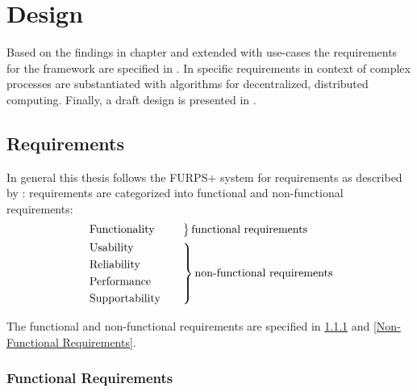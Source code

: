 \chapter{Design} \label{Design}


Based on the findings in chapter  and extended with use-cases the requirements for the framework are specified in . In  specific requirements in context of complex processes are substantiated with algorithms for decentralized, distributed computing. Finally, a draft design is presented in .

	\section{Requirements} \label{Requirements}
	
	In general this thesis follows the FURPS+ system for requirements as described by \textcite{Online:FURPS}: 
	requirements are categorized into functional and non-functional requirements:
	\begin{alignat*}{1}
		& \begin{rcases*}
			\mathmakebox[\widthof{\text{Supportability}}][l]{\text{Functionality}} & \quad
			\end{rcases*} \mathmakebox[\widthof{\text{non-functional requirements}}][l]{\text{functional requirements}} \\
		& \begin{rcases*}
			\text{Usability} & \quad \\
			\text{Reliability} & \quad \\
			\text{Performance} & \quad \\
			\text{Supportability} & \quad
		\end{rcases*} \text{non-functional requirements}
	\end{alignat*}
	
	The functional and non-functional requirements are specified in \ref{Functional Requirements} and \ref{Non-Functional Requirements}. 
	
	\subsection{Functional Requirements} \label{Functional Requirements}
	
